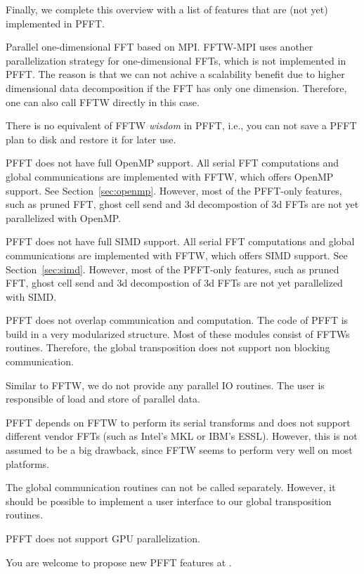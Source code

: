 Finally, we complete this overview with a list of features that are (not yet) implemented in PFFT.
\begin{compactitem}
  \item Parallel one-dimensional FFT based on MPI. FFTW-MPI uses another parallelization strategy for one-dimensional FFTs, which is not implemented in PFFT.
        The reason is that we can not achive a scalability benefit due to higher dimensional data decomposition if the FFT has only one dimension.
        Therefore, one can also call FFTW directly in this case.
  \item There is no equivalent of FFTW \emph{wisdom} in PFFT, i.e., you can not save a PFFT plan to disk and restore it for later use.
  \item PFFT does not have full OpenMP support. All serial FFT computations and global communications are implemented with FFTW,
        which offers OpenMP support. See Section~\ref{sec:openmp}. However, most of the PFFT-only features, such as pruned FFT, ghost cell send and 3d decompostion of 3d FFTs are not yet parallelized with OpenMP.
  \item PFFT does not have full SIMD support. All serial FFT computations and global communications are implemented with FFTW,
        which offers SIMD support. See Section~\ref{sec:simd}. However, most of the PFFT-only features, such as pruned FFT, ghost cell send and 3d decompostion of 3d FFTs are not yet parallelized with SIMD.
  \item PFFT does not overlap communication and computation. The code of PFFT is build in a very modularized structure. Most of these modules consist
        of FFTWs routines. Therefore, the global transposition does not support non blocking communication.
  \item Similar to FFTW, we do not provide any parallel IO routines. The user is responsible of load and store of parallel data.
  \item PFFT depends on FFTW to perform its serial transforms and does not support different vendor FFTs (such as Intel's MKL or IBM's ESSL).
        However, this is not assumed to be a big drawback, since FFTW seems to perform very well on most platforms.
  \item The global communication routines can not be called separately. However, it should be possible to implement a user interface to our global
        transposition routines.
  \item PFFT does not support GPU parallelization.
\end{compactitem}
You are welcome to propose new PFFT features at \webpfft.

